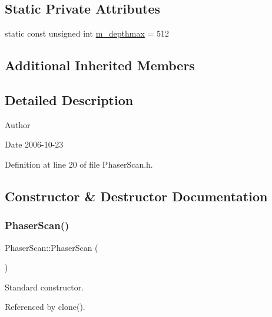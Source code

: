 \subsection*{Static Private Attributes}
\begin{DoxyCompactItemize}
\item 
static const unsigned int \hyperlink{classPhaserScan_a3c5a969d3fef57564d2632b256bf857e}{m\+\_\+depthmax} = 512
\end{DoxyCompactItemize}
\subsection*{Additional Inherited Members}


\subsection{Detailed Description}
\begin{DoxyAuthor}{Author}

\end{DoxyAuthor}
\begin{DoxyDate}{Date}
2006-\/10-\/23 
\end{DoxyDate}


Definition at line 20 of file Phaser\+Scan.\+h.



\subsection{Constructor \& Destructor Documentation}
\mbox{\label{classPhaserScan_afba6f21affa3e014fe4019dfd9664672}} 
\subsubsection{\texorpdfstring{Phaser\+Scan()}{PhaserScan()}}
{\footnotesize\ttfamily Phaser\+Scan\+::\+Phaser\+Scan (\begin{DoxyParamCaption}{ }\end{DoxyParamCaption})}



Standard constructor. 



Referenced by clone().

\mbox{\label{classPhaserScan_a861dfecc0610514a146c300a7458bad5}} 
